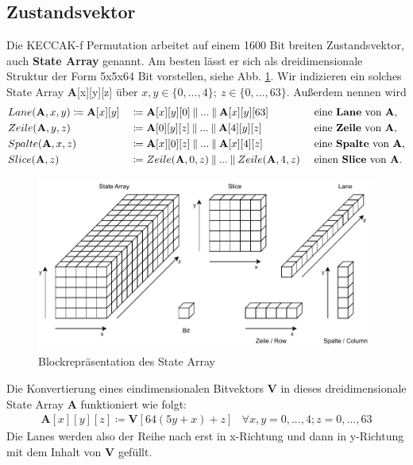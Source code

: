 \subsection{Zustandsvektor}
Die KECCAK-f Permutation arbeitet auf einem 1600 Bit breiten Zustandsvektor, auch \textbf{State Array} genannt.
Am besten lässt er sich als dreidimensionale Struktur der Form 5x5x64 Bit vorstellen, siehe Abb. \ref{fig:statearray}.
Wir indizieren ein solches State Array \textbf{A}[x][y][z] über $x,y \in \{0,...,4\};\ z \in \{0,...,63\}$. Außerdem nennen wird
\begin{align*}
	&Lane(\textbf{A},x,y) \coloneq \textbf{A}[x][y] && \coloneq \textbf{A}[x][y][0] \mathbin\Vert ... \mathbin\Vert \textbf{A}[x][y][63] && \text{ eine \textbf{Lane} von \textbf{A},} \\
	&Zeile(\textbf{A},y,z) && \coloneq \textbf{A}[0][y][z] \mathbin\Vert ... \mathbin\Vert \textbf{A}[4][y][z] && \text{ eine \textbf{Zeile} von \textbf{A},} \\
	&Spalte(\textbf{A},x,z) && \coloneq \textbf{A}[x][0][z] \mathbin\Vert ... \mathbin\Vert \textbf{A}[x][4][z] && \text{ eine \textbf{Spalte} von \textbf{A},} \\
	&Slice(\textbf{A},z) && \coloneq Zeile(\textbf{A},0,z) \mathbin\Vert ... \mathbin\Vert Zeile(\textbf{A},4,z) && \text{ einen \textbf{Slice} von \textbf{A}.} \\
\end{align*}
\begin{figure}
	\center
	\includegraphics{images/StateArrayBeschreibung.pdf}
	\caption{Blockrepräsentation des State Array}
	\label{fig:statearray}
\end{figure}
Die Konvertierung eines eindimensionalen Bitvektors \textbf{V} in dieses dreidimensionale State Array \textbf{A} funktioniert wie folgt:
\begin{align*}
	\textbf{A}[x][y][z] \coloneq \textbf{V}[64(5y + x) + z] & \forall x,y = 0,...,4; z = 0,...,63
\end{align*}
Die Lanes werden also der Reihe nach erst in x-Richtung und dann in y-Richtung mit dem Inhalt von \textbf{V} gefüllt.

